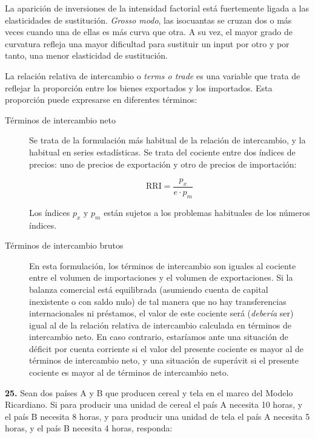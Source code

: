 \documentclass{nuevotema}
\begin{document}
La aparición de inversiones de la intensidad factorial está fuertemente ligada a las elasticidades de sustitución. \textit{Grosso modo}, las isocuantas se cruzan dos o más veces cuando una de ellas es más curva que otra. A su vez, el mayor grado de curvatura refleja una mayor dificultad para sustituir un input por otro y por tanto, una menor elasticidad de sustitución.


La relación relativa de intercambio o \textit{terms o trade} es una variable que trata de reflejar la proporción entre los bienes exportados y los importados. Esta proporción puede expresarse en diferentes términos:

\begin{description}
	\item[Términos de intercambio neto] Se trata de la formulación más habitual de la relación de intercambio, y la habitual en series estadísticas. Se trata del cociente entre dos índices de precios: uno de precios de exportación y otro de precios de importación:
	
	\begin{equation*}
		\textrm{RRI} = \frac{p_x}{e \cdot p_m}
	\end{equation*}
	
	Los índices $p_x$ y $p_m$ están sujetos a los problemas habituales de los números índices.
	
	\item[Términos de intercambio brutos] En esta formulación, los términos de intercambio son iguales al cociente entre el volumen de importaciones y el volumen de exportaciones. Si la balanza comercial está equilibrada (asumiendo cuenta de capital inexistente o con saldo nulo) de tal manera que no hay transferencias internacionales ni préstamos, el valor de este cociente será (\textit{debería} ser) igual al de la relación relativa de intercambio calculada en términos de intercambio neto. En caso contrario, estaríamos ante una situación de déficit por cuenta corriente si el valor del presente cociente es mayor al de términos de intercambio neto, y una situación de superávit si el presente cociente es mayor al de términos de intercambio neto. 
\end{description}

\preguntas


\textbf{25.} Sean dos países A y B que producen cereal y tela en el marco del Modelo Ricardiano. Si para producir una unidad de cereal el país A necesita 10 horas, y el país B necesita 8 horas, y para producir una unidad de tela el país A necesita 5 horas, y el país B necesita 4 horas, responda:
\end{document}
